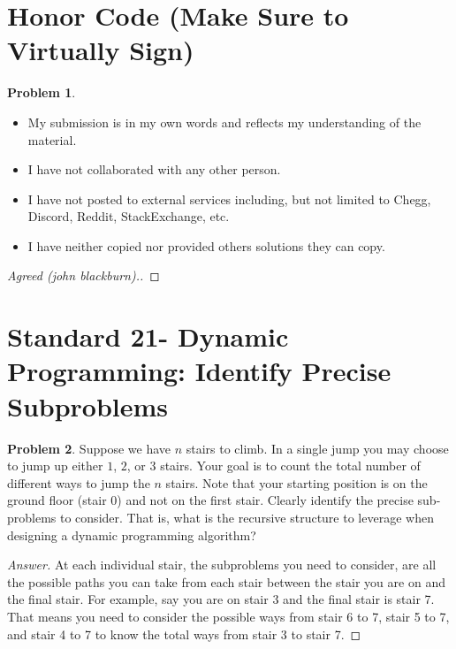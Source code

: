 \documentclass[11pt]{article}
\theoremstyle{definition}
\theoremstyle{definition}
\newtheorem{required}{Problem}
\theoremstyle{definition}
\begin{document}
\section{Honor Code (Make Sure to Virtually Sign)} \label{HonorCode}

\begin{required}
\noindent 
\begin{itemize}
\item My submission is in my own words and reflects my understanding of the material.
\item I have not collaborated with any other person.
\item I have not posted to external services including, but not limited to Chegg, Discord, Reddit, StackExchange, etc.
\item I have neither copied nor provided others solutions they can copy.
\end{itemize}

\end{required}

\begin{proof}[Agreed (john blackburn).]
\end{proof}



\newpage
\section{Standard 21- Dynamic Programming: Identify Precise Subproblems}
\begin{required}
Suppose we have $n$ stairs to climb. In a single jump you may choose to jump up either $1$, $2$, or $3$ stairs. Your goal is to count the total number of different ways to jump the $n$ stairs. Note that your starting position is on the ground floor (stair 0) and not on the first stair. Clearly identify the precise sub-problems to consider. That is, what is the recursive structure to leverage when designing a dynamic programming algorithm? 
\end{required}

\begin{proof}[Answer]
At each individual stair, the subproblems you need to consider, are all the possible paths you can take from each stair between the stair you are on and the final stair. For example, say you are on stair 3 and the final stair is stair 7. That means you need to consider the possible ways from stair 6 to 7, stair 5 to 7, and stair 4 to 7 to know the total ways from stair 3 to stair 7. 
\end{proof}


\end{document}
